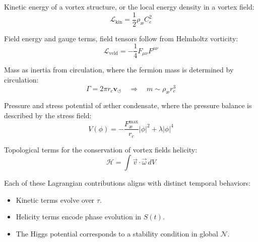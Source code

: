 \documentclass[12pt]{article}
\begin{document}
Kinetic energy of a vortex structure, or the local energy density in a vortex field:
\[
    \mathcal{L}_\text{kin} = \frac{1}{2}\rho_\text{\ae} C_e^2
\]

Field energy and gauge terms, field tensors follow from Helmholtz vorticity:
\[
    \mathcal{L}_\text{veld} = -\frac{1}{4}F_{\mu\nu}F^{\mu\nu}
\]

Mass as inertia from circulation, where the fermion mass is determined by circulation:
\[
    \Gamma = 2\pi r_c \mathbf{v}_{\scriptscriptstyle\boldsymbol{\circlearrowleft}} \quad\Rightarrow\quad m \sim \rho_\text{\ae} r_c^3
\]

Pressure and stress potential of \ae{}ther condensate, where the pressure balance is described by the stress field:
\[
    V(\phi) = -\frac{F^{\text{max}}_{\text{\ae}}}{r_c}|\phi|^2 + \lambda|\phi|^4
\]

Topological terms for the conservation of vortex fields helicity:
\[
    \mathcal{H} = \int \vec{v}\cdot\vec{\omega}\, dV
\]

Each of these Lagrangian contributions aligns with distinct temporal behaviors:
\begin{itemize}
    \item Kinetic terms evolve over $\tau$.
    \item Helicity terms encode phase evolution in $S(t)$.
    \item The Higgs potential corresponds to a stability condition in global $\mathcal{N}$.
\end{itemize}
\end{document}

